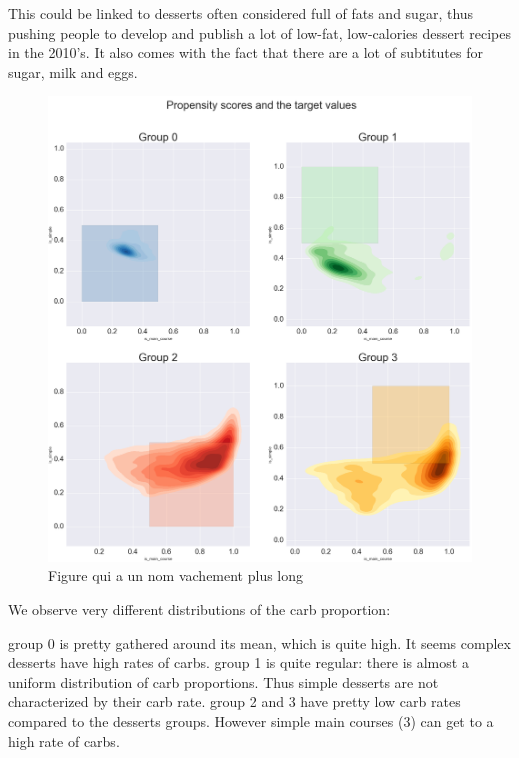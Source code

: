 \documentclass[11pt]{article}
\begin{document}
This could be linked to desserts often considered full of fats and sugar, thus pushing people to develop and publish a lot of low-fat, low-calories dessert recipes in the 2010's. It also comes with the fact that there are a lot of subtitutes for sugar, milk and eggs.

\begin{figure}[!h]
	\includegraphics[width=\columnwidth]{../propensity-r.png}
	\caption{Figure qui a un nom vachement plus long}
	\label{fig:2}
\end{figure}

We observe very different distributions of the carb proportion:

group 0 is pretty gathered around its mean, which is quite high. It seems complex desserts have high rates of carbs.
group 1 is quite regular: there is almost a uniform distribution of carb proportions. Thus simple desserts are not characterized by their carb rate.
group 2 and 3 have pretty low carb rates compared to the desserts groups. However simple main courses (3) can get to a high rate of carbs.
\end{document}
